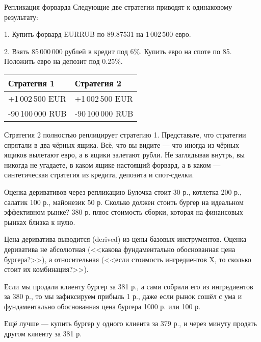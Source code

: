 \documentclass{beamer}
\begin{document}
\begin{frame}{Репликация форварда}
\justify
Следующие две стратегии приводят к одинаковому результату:

1. Купить форвард EURRUB по 89.87531 на 1\,002\,500 евро.

2. Взять 85\,000\,000 рублей в кредит под 6\%. Купить евро на споте по 85. Положить евро на депозит под 0.25\%.

\justify
\centering
\begin{tabular}{l|l}
Стратегия 1       & Стратегия 2 \\ \hline
+1\,002\,500 EUR  & +1\,002\,500 EUR \\
-90\,100\,000 RUB & -90\,100\,000 RUB
\end{tabular}

\justify
Стратегия 2 полностью \alert{реплицирует} стратегию 1. Представьте, что стратегии спрятали в два чёрных ящика. Всё, что вы видите --- что иногда из чёрных ящиков вылетают евро, а в ящики залетают рубли. Не заглядывая внутрь, вы никогда не угадаете, в каком ящике настоящий форвард, а в каком --- синтетическая стратегия из кредита, депозита и спот-сделки.
\end{frame}



\begin{frame}{Оценка деривативов через репликацию}
\justify
Булочка стоит 30 р., котлетка 200 р., салатик 100 р., майонезик 50 р. Сколько должен стоить бургер на идеальном эффективном рынке? 380 р. плюс стоимость сборки, которая на финансовых рынках близка к нулю.

\justify
Цена дериватива выводится (derived) из цены базовых инструментов. Оценка дериватива
не абсолютная (<<какова фундаментально обоснованная цена бургера?>>), а относительная (<<если стоимость ингредиентов X, то сколько стоит их комбинация?>>).

\justify
Если мы продали клиенту бургер за 381 р., а сами собрали его из ингредиентов за 380 р., то мы зафиксируем прибыль 1 р., даже если рынок сошёл с ума и фундаментально обоснованная цена бургера 1000 р. или 100 р.

\justify
Ещё лучше --- купить бургер у одного клиента за 379 р., и через минуту продать
другом клиенту за 381 р.
\end{frame}
\end{document}
